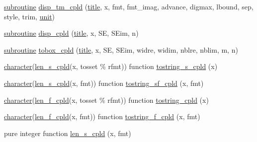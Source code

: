 \begin{DoxyCompactItemize}
\item 
\hyperlink{M__stopwatch_83_8txt_acfbcff50169d691ff02d4a123ed70482}{subroutine} \hyperlink{namespacem__display_a3970deee1f608f73e9fd13b17b946088}{disp\+\_\+tm\+\_\+cpld} (\hyperlink{print__watch_83_8txt_a15b5bd21156bb9fca6a755ab8c029a9c}{title}, x, fmt, fmt\+\_\+imag, advance, digmax, lbound, sep, style, trim, \hyperlink{M__stopwatch_83_8txt_a5cbef30eb7c0d734bd82f5a7ebea9aa7}{unit})
\item 
\hyperlink{M__stopwatch_83_8txt_acfbcff50169d691ff02d4a123ed70482}{subroutine} \hyperlink{namespacem__display_a331e5caf7f78cff8f7e19145001bcdca}{disp\+\_\+cpld} (\hyperlink{print__watch_83_8txt_a15b5bd21156bb9fca6a755ab8c029a9c}{title}, x, SE, S\+Eim, n)
\item 
\hyperlink{M__stopwatch_83_8txt_acfbcff50169d691ff02d4a123ed70482}{subroutine} \hyperlink{namespacem__display_ac4ed462092efa64e5ce8454e7a752d10}{tobox\+\_\+cpld} (\hyperlink{print__watch_83_8txt_a15b5bd21156bb9fca6a755ab8c029a9c}{title}, x, SE, S\+Eim, widre, widim, nblre, nblim, m, n)
\item 
\hyperlink{option__stopwatch_83_8txt_abd4b21fbbd175834027b5224bfe97e66}{character}(\hyperlink{namespacem__display_ace35690c2f36e28f07336cc7dcff47f4}{len\+\_\+s\+\_\+cpld}(x, tosset \% rfmt)) function \hyperlink{namespacem__display_ac2a60653468bfb9215fb85b4518363e9}{tostring\+\_\+s\+\_\+cpld} (x)
\item 
\hyperlink{option__stopwatch_83_8txt_abd4b21fbbd175834027b5224bfe97e66}{character}(\hyperlink{namespacem__display_ace35690c2f36e28f07336cc7dcff47f4}{len\+\_\+s\+\_\+cpld}(x, fmt)) function \hyperlink{namespacem__display_a9f3f8dad4340213fd6587a5657b366e0}{tostring\+\_\+sf\+\_\+cpld} (x, fmt)
\item 
\hyperlink{option__stopwatch_83_8txt_abd4b21fbbd175834027b5224bfe97e66}{character}(\hyperlink{namespacem__display_a803611d2a793f2a4aa7563b6c8295cb3}{len\+\_\+f\+\_\+cpld}(x, tosset \% rfmt)) function \hyperlink{namespacem__display_a12b973ec5880a8f0d789fbdf433d177f}{tostring\+\_\+cpld} (x)
\item 
\hyperlink{option__stopwatch_83_8txt_abd4b21fbbd175834027b5224bfe97e66}{character}(\hyperlink{namespacem__display_a803611d2a793f2a4aa7563b6c8295cb3}{len\+\_\+f\+\_\+cpld}(x, fmt)) function \hyperlink{namespacem__display_a7bab74c992649c74c27fe924c235e448}{tostring\+\_\+f\+\_\+cpld} (x, fmt)
\item 
pure integer function \hyperlink{namespacem__display_ace35690c2f36e28f07336cc7dcff47f4}{len\+\_\+s\+\_\+cpld} (x, fmt)
\item 

\end{DoxyCompactItemize}
